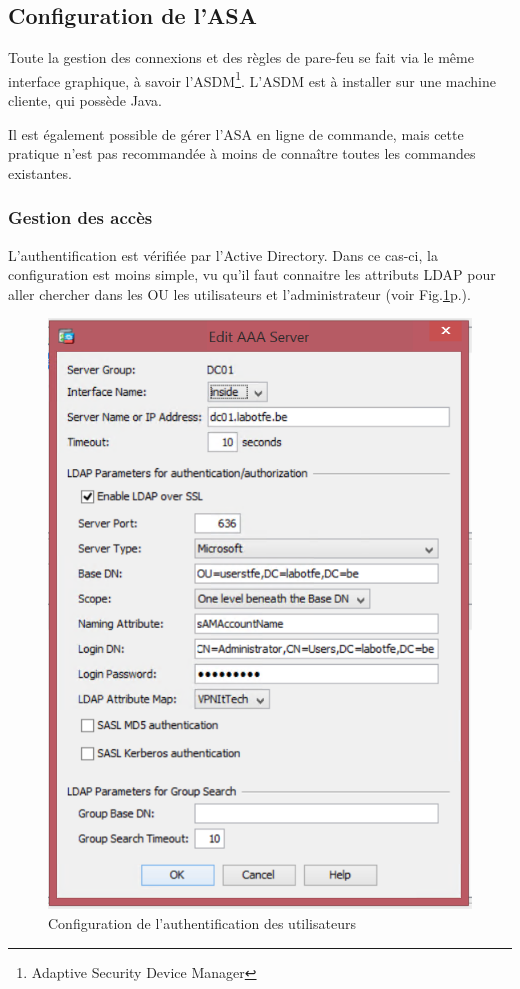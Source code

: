 \subsection{Configuration de l'ASA}
Toute la gestion des connexions et des règles de pare-feu se fait via le même interface graphique, à savoir l'ASDM\footnote{Adaptive Security Device Manager}.
L'ASDM est à installer sur une machine cliente, qui possède Java.

Il est également possible de gérer l'ASA en ligne de commande, mais cette pratique n'est pas recommandée à moins de connaître toutes les commandes existantes.

\subsubsection{Gestion des accès}
L'authentification est vérifiée par l'Active Directory. 
Dans ce cas-ci, la configuration est moins simple, vu qu'il faut connaitre les attributs LDAP pour aller chercher dans les OU les utilisateurs et l'administrateur (voir Fig.\ref{fig:authCisco}p.\pageref{fig:authCisco}).
\begin{figure}[ht]
	\centering
	\includegraphics{Cisco/AAA-Ldap.png}
	\caption{Configuration de l'authentification des utilisateurs}
	\label{fig:authCisco}
\end{figure}

